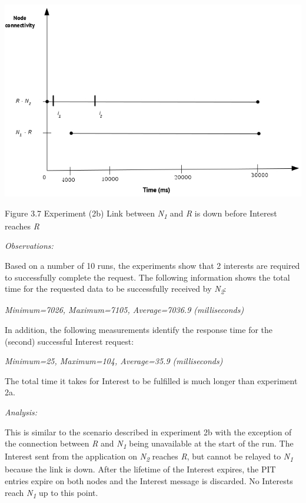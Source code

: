 \documentclass[a4paper,12pt]{report}      %
\begin{document}
\noindent\includegraphics[scale=0.55]{exp2b_timediag.jpg}\newline
\begin{center}Figure 3.7 Experiment (2b) Link between \emph{N\textsubscript{1}} and \emph{R} is down before Interest reaches \emph{R}\end{center}

\vspace*{1\baselineskip}\noindent\emph{Observations:}

Based on a number of 10 runs, the experiments show that 2 interests are required to successfully
complete the request. The following information shows the total time for the requested data to be
successfully received by  \emph{N\textsubscript{2}}:

\begin{center}\textsl{Minimum=7026, Maximum=7105, Average=7036.9 (milliseconds)}\end{center}

In addition, the following measurements identify the response time for the (second) successful Interest
request:

\begin{center}\textsl{Minimum=25, Maximum=104, Average=35.9 (milliseconds)}\end{center}

The total time it takes for Interest to be fulfilled is much longer than experiment 2a.

\vspace*{1\baselineskip}\noindent\emph{Analysis:}

This is similar to the scenario described in experiment 2b with the exception of the connection between 
 \emph{R} and \emph{N\textsubscript{1}} being unavailable at the start of the run. The Interest sent from the application
on \emph{N\textsubscript{2}} reaches \emph{R}, but cannot be relayed to \emph{N\textsubscript{1}} because the link is down. After
the lifetime of the Interest expires, the PIT entries expire on both nodes and the Interest message is
discarded. No Interests reach \emph{N\textsubscript{1}} up to this point.
\end{document}
